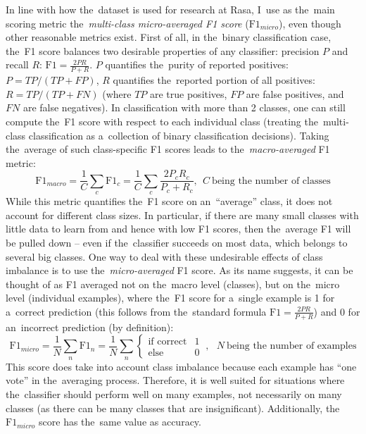 \documentclass[bsc,frontabs,singlespacing,parskip,deptreport]{infthesis}
\begin{document}
{{{      In line with how the~dataset is used for research at Rasa, I~use as the~main scoring metric the~\textit{multi-class micro-averaged F1 score} ($\text{F1}_{micro}$), even though other reasonable metrics exist. First of all, in the~binary classification case, the~F1 score balances two desirable properties of any classifier: precision $P$ and recall $R$: $\text{F1} = \frac{2 P R}{P+R}$.
      $P$ quantifies the~purity of reported positives: $P=TP/(TP+FP)$, $R$ quantifies the~reported portion of all positives: $R=TP/(TP+FN)$ (where $TP$ are true positives, $FP$ are false positives, and $FN$ are false negatives).
      In classification with more than 2 classes, one can still compute the~F1 score with respect to each individual class (treating the~multi-class classification as a~collection of binary classification decisions). Taking the~average of such class-specific F1 scores leads to the~\textit{macro-averaged} F1 metric:
      \begin{equation}
        \text{F1}_{macro} = \frac{1}{C}\sum_c \text{F1}_c = \frac{1}{C}\sum_c \frac{2 P_c R_c}{P_c+R_c}, \ \  C\ \text{being the~number of classes}
      \end{equation}
      While this metric quantifies the~F1 score on an~``average'' class, it does not account for different class sizes. In particular, if there are many small classes with little data to learn from and hence with low F1 scores, then the~average F1 will be pulled down -- even if the~classifier succeeds on most data, which belongs to several big classes.
      One way to deal with these undesirable effects of class imbalance is to use the~\textit{micro-averaged} F1 score. As its name suggests, it can be thought of as F1 averaged not on the~macro level (classes), but on the~micro level (individual examples), where the~F1 score for a~single example is 1 for a~correct prediction (this follows from the~standard formula $\text{F1} = \frac{2 P R}{P+R}$) and 0 for an~incorrect prediction (by definition):
      \begin{equation}
        \text{F1}_{micro} = \frac{1}{N}\sum_n \text{F1}_n = \frac{1}{N}\sum_n {\begin{cases}\text{if correct} & 1\\ \text{else} & 0\end{cases}}\ ,\ \ \  N\ \text{being the~number of examples}
      \end{equation}
      This score does take into account class imbalance because each example has ``one vote'' in the~averaging process. Therefore, it is well suited for situations where the~classifier should perform well on many examples, not necessarily on many classes (as there can be many classes that are insignificant).
      Additionally, the~$\text{F1}_{micro}$ score has the~same value as accuracy.
    }
  }

}
\end{document}
